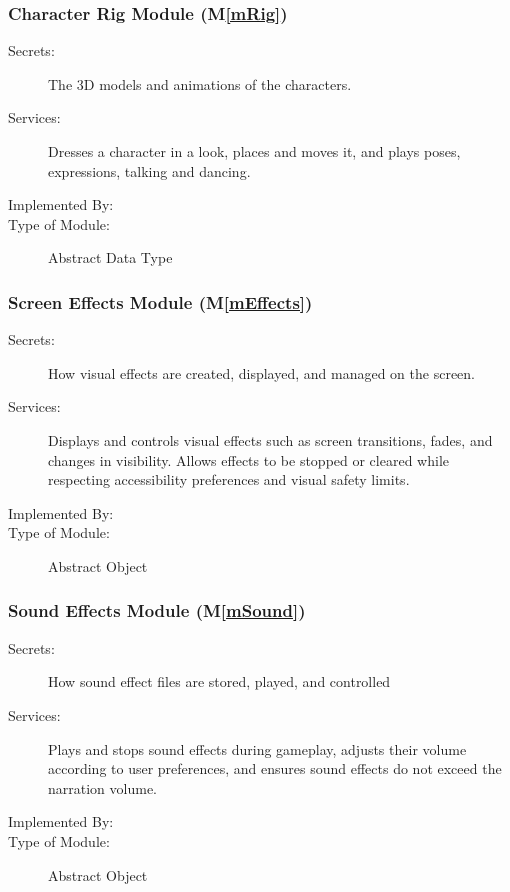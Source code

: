 \documentclass[10pt, titlepage]{article}
\newcommand{\mplainref}[1]{M\ref*{#1}}
\begin{document}
\subsubsection{Character Rig Module (\mplainref{mRig})}\label{md:mRig}

\begin{description}
\item[Secrets:] The 3D models and animations of the characters.
\item[Services:] Dresses a character in a look, places and moves it, and plays
  poses, expressions, talking and dancing.
\item[Implemented By:] \progname{}
\item[Type of Module:] Abstract Data Type
\end{description}

\subsubsection{Screen Effects Module (\mplainref{mEffects})}\label{md:mEffects}

\begin{description}
\item[Secrets:] How visual effects are created, displayed,
  and managed on the screen.
\item[Services:] Displays and controls visual effects such
  as screen transitions, fades, and changes in visibility.
  Allows effects to be stopped or cleared while respecting
  accessibility preferences and visual safety limits.
\item[Implemented By:] \progname{}
\item[Type of Module:] Abstract Object
\end{description}

\subsubsection{Sound Effects Module (\mplainref{mSound})}\label{md:mSound}

\begin{description}
\item[Secrets:] How sound effect files are stored, played,
  and controlled
\item[Services:] Plays and stops sound effects during
  gameplay, adjusts their volume according to user
  preferences, and ensures sound effects do not exceed
  the narration volume.
\item[Implemented By:] \progname{}
\item[Type of Module:] Abstract Object
\end{description}
\end{document}
